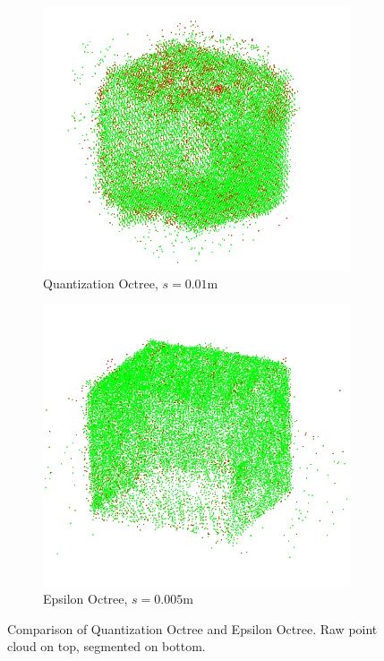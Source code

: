 \begin{figure}[h!tp]
    \begin{subfigure}[b]{0.4\textwidth}
        \centering
        \includegraphics[width=0.9\linewidth]{images/eval-clouds-quant-segmented2}
        \caption{Quantization Octree, $s=0.01$m}
    \end{subfigure}%
    \begin{subfigure}[b]{0.4\textwidth}
        \centering
        \includegraphics[width=0.9\linewidth]{images/eval-clouds-epsilon-segmented}
        \caption{Epsilon Octree, $s=0.005$m}
    \end{subfigure}%

    \caption{Comparison of Quantization Octree and Epsilon Octree. Raw point cloud on top, segmented on bottom.}
    \label{fig:octrees-compairison}
\end{figure}

